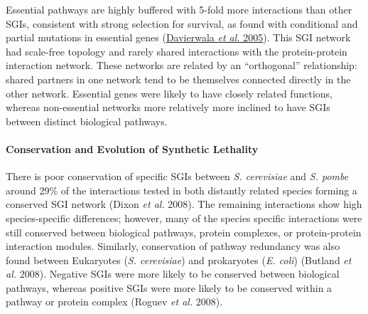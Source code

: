 Essential pathways are highly buffered with 5-fold more interactions than other SGIs, consistent with strong selection for survival, as found with conditional and partial mutations in essential genes (\hyperlink{ENREF28}{Davierwala}\hyperlink{ENREF28}{\textit{ et al.}}\hyperlink{ENREF28}{ 2005}). This SGI network had scale-free topology and rarely shared interactions with the protein-protein interaction network. These networks are related by an ``orthogonal'' relationship: shared partners in one network tend to be themselves connected directly in the other network. Essential genes were likely to have closely related functions, whereas non-essential networks more relatively more inclined to have SGIs between distinct biological pathways. 

\paragraph{Conservation and Evolution of Synthetic Lethality}
There is poor conservation of specific SGIs between \textit{S. cerevisiae} and \textit{S. pombe} around 29\% of the interactions tested in both distantly related species forming a conserved SGI network (Dixon\textit{ et al.} 2008). The remaining interactions show high species-specific differences; however, many of the species specific interactions were still conserved between biological pathways, protein complexes, or protein-protein interaction modules. Similarly, conservation of pathway redundancy was also found between  Eukaryotes (\textit{S. cerevisiae}) and prokaryotes (\textit{E. coli}) (Butland\textit{ et al.} 2008). Negative SGIs were more likely to be conserved between biological pathways, whereas positive SGIs were more likely to be conserved within a pathway or protein complex (Roguev\textit{ et al.} 2008). 

